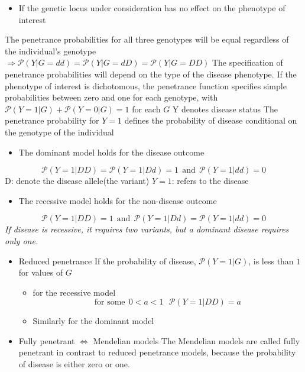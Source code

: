 \documentclass[a4paper,twoside,11pt]{article}
\begin{document}
\begin{itemize}
    \item If the genetic locus under consideration has no effect on the phenotype of interest
\end{itemize}
The penetrance probabilities for all three genotypes will be equal regardless of the individual’s genotype $\Rightarrow \mathcal{P}(Y|G=dd) = \mathcal{P}(Y|G=dD) = \mathcal{P}(Y|G=DD)$
\newline
\newline
The specification of penetrance probabilities will depend on the type of the disease phenotype. If the phenotype of interest is dichotomous, the penetrance function specifies simple probabilities between zero and one for each genotype, with $\mathcal{P}(Y=1|G) + \mathcal{P}(Y=0|G)=1$ for each $G$
\newline
\newline
\textcolor{NavyBlue}{Y} denotes disease status 
\newline
\textcolor{NavyBlue}{The penetrance probability for $Y=1$} defines the probability of disease conditional on the genotype of the individual
\begin{itemize}
    \item The dominant model holds for the disease outcome
\end{itemize}
$$
\mathcal{P}(Y=1|DD) = \mathcal{P}(Y=1|Dd) = 1 \ \ \text{and} \ \ \mathcal{P}(Y=1|dd)=0
$$
\textcolor{NavyBlue}{D: }denote the disease allele(the variant)
\newline
\textcolor{NavyBlue}{$Y=1$: }refers to the disease 
\begin{itemize}
    \item The recessive model holds for the non-disease outcome
\end{itemize}
$$
\mathcal{P}(Y=1|DD)=1 \ \ \text{and} \ \ \mathcal{P}(Y=1|Dd) = \mathcal{P}(Y=1|dd) = 0
$$
\textcolor{NavyBlue}{\textit{If disease is recessive, it requires two variants, but a dominant disease requires only one. }}
\begin{itemize}
    \item Reduced penetrance 
\newline
If the probability of disease, $\mathcal{P}(Y=1|G)$, is less than $1$ for values of $G$ 
    \begin{itemize}
        \item for the recessive model
$$
\text{for some} \ \ 0 < a < 1 \ \ \ \mathcal{P}(Y=1|DD) = a 
$$
        \item Similarly for the dominant model
    \end{itemize}
    \item Fully penetrant $\Leftrightarrow$ Mendelian models 
\newline
The Mendelian models are called fully penetrant in contrast to reduced penetrance models, because the probability of disease is either zero or one.
\end{itemize}
\end{document}
